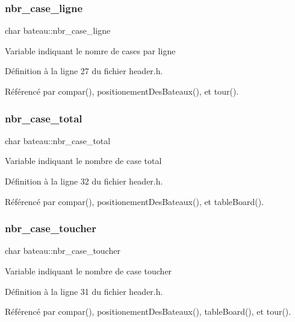 \subsubsection{\texorpdfstring{nbr\+\_\+case\+\_\+ligne}{nbr\_case\_ligne}}
{\footnotesize\ttfamily char bateau\+::nbr\+\_\+case\+\_\+ligne}

Variable indiquant le nomre de cases par ligne 

Définition à la ligne 27 du fichier header.\+h.



Référencé par compar(), positionement\+Des\+Bateaux(), et tour().

\mbox{\label{structbateau_aff445dc58a52069759f1e4bfd13c0313}} 
\subsubsection{\texorpdfstring{nbr\+\_\+case\+\_\+total}{nbr\_case\_total}}
{\footnotesize\ttfamily char bateau\+::nbr\+\_\+case\+\_\+total}

Variable indiquant le nombre de case total 

Définition à la ligne 32 du fichier header.\+h.



Référencé par compar(), positionement\+Des\+Bateaux(), et table\+Board().

\mbox{\label{structbateau_a62ae80832c521a9984c520fde88dadfd}} 
\subsubsection{\texorpdfstring{nbr\+\_\+case\+\_\+toucher}{nbr\_case\_toucher}}
{\footnotesize\ttfamily char bateau\+::nbr\+\_\+case\+\_\+toucher}

Variable indiquant le nombre de case toucher 

Définition à la ligne 31 du fichier header.\+h.



Référencé par compar(), positionement\+Des\+Bateaux(), table\+Board(), et tour().

\mbox{\label{structbateau_a77fe0bf7801ff08bf9b17e6c6237692e}} 

